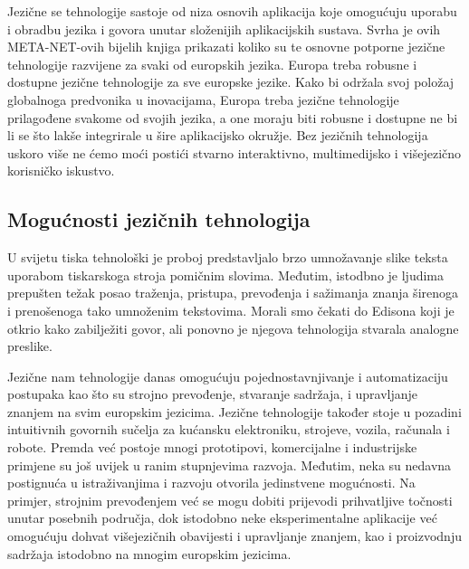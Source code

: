 \begin{multicols}{2}

Jezične se tehnologije sastoje od niza osnovih aplikacija koje omogućuju uporabu i obradbu jezika i govora unutar složenijih aplikacijskih sustava. Svrha je ovih META-NET-ovih bijelih knjiga prikazati koliko su te osnovne potporne jezične tehnologije razvijene za svaki od europskih jezika. Europa treba robusne i dostupne jezične tehnologije za sve europske jezike. Kako bi održala svoj položaj globalnoga predvonika u inovacijama, Europa treba jezične tehnologije prilagođene svakome od svojih jezika, a one moraju biti robusne i dostupne ne bi li se što lakše integrirale u šire aplikacijsko okružje. Bez jezičnih tehnologija uskoro više ne ćemo moći postići stvarno interaktivno, multimedijsko i višejezično korisničko iskustvo.

\subsection{Mogućnosti jezičnih tehnologija}

U svijetu tiska tehnološki je proboj predstavljalo brzo umnožavanje slike teksta uporabom tiskarskoga stroja pomičnim slovima. Međutim, istodbno je ljudima prepušten težak posao traženja, pristupa, prevođenja i sažimanja znanja širenoga i prenošenoga tako umnoženim tekstovima. Morali smo čekati do Edisona koji je otkrio kako zabilježiti govor, ali ponovno je njegova tehnologija stvarala analogne preslike.

Jezične nam tehnologije danas omogućuju pojednostavnjivanje i automatizaciju postupaka kao što su strojno prevođenje, stvaranje sadržaja, i upravljanje znanjem na svim europskim jezicima. Jezične tehnologije također stoje u pozadini intuitivnih govornih sučelja za kućansku elektroniku, strojeve, vozila, računala i robote. Premda već postoje mnogi prototipovi, komercijalne i industrijske primjene su još uvijek u ranim stupnjevima razvoja. Međutim, neka su nedavna postignuća u istraživanjima i razvoju otvorila jedinstvene mogućnosti. Na primjer, strojnim prevođenjem već se mogu dobiti prijevodi prihvatljive točnosti unutar posebnih područja, dok istodobno neke eksperimentalne aplikacije već omogućuju dohvat višejezičnih obavijesti i upravljanje znanjem, kao i proizvodnju sadržaja istodobno na mnogim europskim jezicima.


\end{multicols}

